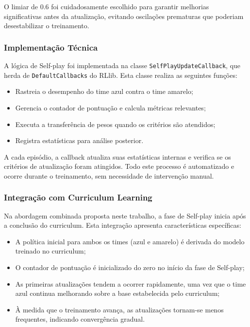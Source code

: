 O limiar de 0.6 foi cuidadosamente escolhido para garantir melhorias significativas antes da atualização, evitando oscilações prematuras que poderiam desestabilizar o treinamento.

\subsubsection{Implementação Técnica}

A lógica de Self-play foi implementada na classe \texttt{SelfPlayUpdateCallback}, que herda de \texttt{DefaultCallbacks} do RLlib. Esta classe realiza as seguintes funções:

\begin{itemize}
    \item Rastreia o desempenho do time azul contra o time amarelo;
    \item Gerencia o contador de pontuação e calcula métricas relevantes;
    \item Executa a transferência de pesos quando os critérios são atendidos;
    \item Registra estatísticas para análise posterior.
\end{itemize}

A cada episódio, a callback atualiza suas estatísticas internas e verifica se os critérios de atualização foram atingidos. Todo este processo é automatizado e ocorre durante o treinamento, sem necessidade de intervenção manual.

\subsubsection{Integração com Curriculum Learning}

Na abordagem combinada proposta neste trabalho, a fase de Self-play inicia após a conclusão do curriculum. Esta integração apresenta características específicas:

\begin{itemize}
    \item A política inicial para ambos os times (azul e amarelo) é derivada do modelo treinado no curriculum;
    \item O contador de pontuação é inicializado do zero no início da fase de Self-play;
    \item As primeiras atualizações tendem a ocorrer rapidamente, uma vez que o time azul continua melhorando sobre a base estabelecida pelo curriculum;
    \item À medida que o treinamento avança, as atualizações tornam-se menos frequentes, indicando convergência gradual.
\end{itemize}

